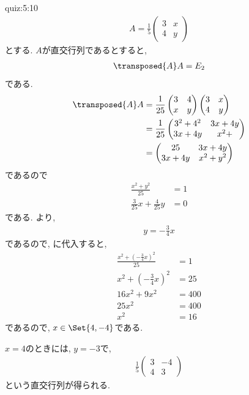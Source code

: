 \begin{answerof}{quiz:5:10}
  \begin{align*}
    A=\frac{1}{5}\begin{pmatrix}3&x\\4&y\end{pmatrix}
  \end{align*}
  とする.
  $A$が直交行列であるとすると,
  \begin{align*}
    \transposed{A}A=E_2
  \end{align*}
  である.
  \begin{align*}
    \transposed{A}A
    &=\frac{1}{25}\begin{pmatrix}3&4\\x&y\end{pmatrix}\begin{pmatrix}3&x\\4&y\end{pmatrix}\\
    &=\frac{1}{25}\begin{pmatrix}3^2+4^2&3x+4y\\3x+4y&x^2+\end{pmatrix}\\
    &=\begin{pmatrix}25&3x+4y\\3x+4y&x^2+y^2\end{pmatrix}
  \end{align*}
  であるので
  \begin{align}
    \frac{x^2+y^2}{25}&=1\label{orthomat:eq1}\\
    \frac{3}{25}x+\frac{4}{25}y&=0
    \label{orthomat:eq2}
  \end{align}
  である.
  より, 
  \begin{align*}
    y=-\frac{3}{4}x
  \end{align*}
  であるので, に代入すると,
  \begin{align*}
    \frac{x^2+\left(-\frac{3}{4}x\right)^2}{25}&=1\\
    x^2+\left(-\frac{3}{4}x\right)^2&=25\\
    16x^2+9x^2&=400\\
    25x^2&=400\\
    x^2&=16
  \end{align*}
  であるので, $x\in\Set{4,-4}$である.

  $x=4$のときには,
  $y=-3$で,
  \begin{align*}
    \frac{1}{5}\begin{pmatrix}3&-4\\4&3\end{pmatrix}
  \end{align*}
  という直交行列が得られる.


\end{answerof}
